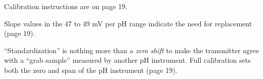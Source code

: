 












Calibration instructions are on page 19.

\vskip 10pt

Slope values in the 47 to 49 mV per pH range indicate the need for replacement (page 19).

\vskip 10pt

``Standardization'' is nothing more than a {\it zero shift} to make the transmitter agree with a ``grab sample'' measured by another pH instrument.  Full calibration sets both the zero and span of the pH instrument (page 19).




